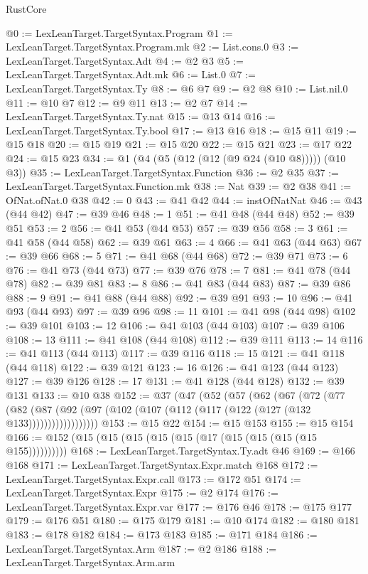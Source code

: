 \begin{lexlean}{RustCore}
\begin{coremodule}
@0 := LexLeanTarget.TargetSyntax.Program
@1 := LexLeanTarget.TargetSyntax.Program.mk
@2 := List.cons.{0}
@3 := LexLeanTarget.TargetSyntax.Adt
@4 := @2 @3
@5 := LexLeanTarget.TargetSyntax.Adt.mk
@6 := List.{0}
@7 := LexLeanTarget.TargetSyntax.Ty
@8 := @6 @7
@9 := @2 @8
@10 := List.nil.{0}
@11 := @10 @7
@12 := @9 @11
@13 := @2 @7
@14 := LexLeanTarget.TargetSyntax.Ty.nat
@15 := @13 @14
@16 := LexLeanTarget.TargetSyntax.Ty.bool
@17 := @13 @16
@18 := @15 @11
@19 := @15 @18
@20 := @15 @19
@21 := @15 @20
@22 := @15 @21
@23 := @17 @22
@24 := @15 @23
@34 := @1 (@4 (@5 (@12 (@12 (@9 @24 (@10 @8))))) (@10 @3))
@35 := LexLeanTarget.TargetSyntax.Function
@36 := @2 @35
@37 := LexLeanTarget.TargetSyntax.Function.mk
@38 := Nat
@39 := @2 @38
@41 := OfNat.ofNat.{0} @38
@42 := 0
@43 := @41 @42
@44 := instOfNatNat
@46 := @43 (@44 @42)
@47 := @39 @46
@48 := 1
@51 := @41 @48 (@44 @48)
@52 := @39 @51
@53 := 2
@56 := @41 @53 (@44 @53)
@57 := @39 @56
@58 := 3
@61 := @41 @58 (@44 @58)
@62 := @39 @61
@63 := 4
@66 := @41 @63 (@44 @63)
@67 := @39 @66
@68 := 5
@71 := @41 @68 (@44 @68)
@72 := @39 @71
@73 := 6
@76 := @41 @73 (@44 @73)
@77 := @39 @76
@78 := 7
@81 := @41 @78 (@44 @78)
@82 := @39 @81
@83 := 8
@86 := @41 @83 (@44 @83)
@87 := @39 @86
@88 := 9
@91 := @41 @88 (@44 @88)
@92 := @39 @91
@93 := 10
@96 := @41 @93 (@44 @93)
@97 := @39 @96
@98 := 11
@101 := @41 @98 (@44 @98)
@102 := @39 @101
@103 := 12
@106 := @41 @103 (@44 @103)
@107 := @39 @106
@108 := 13
@111 := @41 @108 (@44 @108)
@112 := @39 @111
@113 := 14
@116 := @41 @113 (@44 @113)
@117 := @39 @116
@118 := 15
@121 := @41 @118 (@44 @118)
@122 := @39 @121
@123 := 16
@126 := @41 @123 (@44 @123)
@127 := @39 @126
@128 := 17
@131 := @41 @128 (@44 @128)
@132 := @39 @131
@133 := @10 @38
@152 := @37
    (@47
      (@52
        (@57
          (@62
            (@67
              (@72
                (@77
                  (@82
                    (@87 (@92 (@97 (@102 (@107 (@112 (@117 (@122 (@127 (@132 @133))))))))))))))))))
@153 := @15 @22
@154 := @15 @153
@155 := @15 @154
@166 := @152 (@15 (@15 (@15 (@15 (@15 (@17 (@15 (@15 (@15 (@15 @155))))))))))
@168 := LexLeanTarget.TargetSyntax.Ty.adt @46
@169 := @166 @168
@171 := LexLeanTarget.TargetSyntax.Expr.match @168
@172 := LexLeanTarget.TargetSyntax.Expr.call
@173 := @172 @51
@174 := LexLeanTarget.TargetSyntax.Expr
@175 := @2 @174
@176 := LexLeanTarget.TargetSyntax.Expr.var
@177 := @176 @46
@178 := @175 @177
@179 := @176 @51
@180 := @175 @179
@181 := @10 @174
@182 := @180 @181
@183 := @178 @182
@184 := @173 @183
@185 := @171 @184
@186 := LexLeanTarget.TargetSyntax.Arm
@187 := @2 @186
@188 := LexLeanTarget.TargetSyntax.Arm.arm

\end{coremodule}
\end{lexlean}
